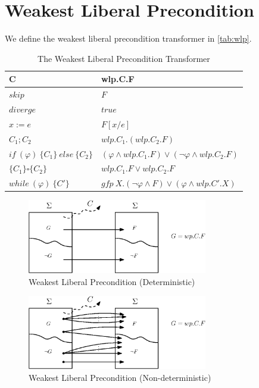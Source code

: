 \section{Weakest Liberal Precondition}
We define the weakest liberal precondition transformer in \autoref{tab:wlp}. 
\begin{table}[ht!]\centering
    \begin{tabular}{ll}
    \hline\hline
      \textbf{C}&\textbf{wlp.C.F}    \\ \hline
      $skip$&   $F$   \\
      $diverge$&  $true$\\
      $x:= e $&  $F[x/e]$\\
      $C_1;C_2$&  $wlp.C_1.(wlp.C_2.F)$\\
      $if\ (\varphi)\ \{C_1\}\ else\ \{C_2\} $&  $(\varphi\wedge wlp.C_1.F)\vee(\neg\varphi\wedge wlp.C_2.F)$\\
      $\{C_1\}\square \{C_2\}$ & $wlp.C_1.F\vee wlp.C_2.F$\\
      $while\ (\varphi)\ \{C'\}$&  $gfp\ X.(\neg\varphi\wedge F)\vee(\varphi\wedge wlp.C'.X)$\\
      \hline\hline
    \end{tabular}
    \caption{The Weakest Liberal Precondition Transformer}
    \label{tab:wlp}
\end{table}

\begin{figure}[ht!]\centering
\includegraphics[width=0.7\textwidth]{image/wlp-det.eps}
\caption{Weakest Liberal Precondition (Deterministic)}
\label{fig:wlp-det}
\end{figure}

\begin{figure}[ht!]\centering
\includegraphics[width=0.7\textwidth]{image/wlp-nondet.eps}
\caption{Weakest Liberal Precondition (Non-deterministic)}
\label{fig:wlp-nondet}
\end{figure}

